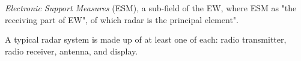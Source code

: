\textit{Electronic Support Measures} (ESM), a sub-field of the EW, where ESM as "the receiving part of EW"\cite{adamy_13_2001}, of which radar is the principal element".




A typical radar system is made up of at least one of each: radio transmitter, radio receiver, antenna, and display\cite{stimson_introduction_1998}. %










